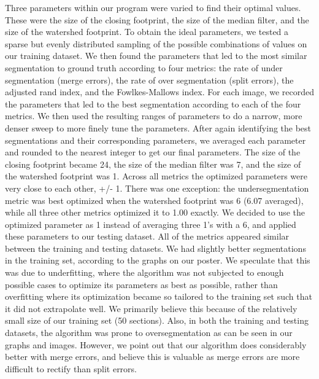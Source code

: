 \documentclass[11pt]{article}
\begin{document}
Three parameters within our program were varied to find their optimal values. These were the size of the closing footprint, the size of the median filter, and the size of the watershed footprint. To obtain the ideal parameters, we tested a sparse but evenly distributed sampling of the possible combinations of values on our training dataset. We then found the parameters that led to the most similar segmentation to ground truth according to four metrics: the rate of under segmentation (merge errors), the rate of over segmentation (split errors), the adjusted rand index, and the Fowlkes-Mallows index. For each image, we recorded the parameters that led to the best segmentation according to each of the four metrics. We then used the resulting ranges of parameters to do a narrow, more denser sweep to more finely tune the parameters. After again identifying the best segmentations and their corresponding parameters, we averaged each parameter and rounded to the nearest integer to get our final parameters. The size of the closing footprint became 24, the size of the median filter was 7, and the size of the watershed footprint was 1. Across all metrics the optimized parameters were very close to each other, +/- 1. There was one exception: the undersegmentation metric was best optimized when the watershed footprint was 6 (6.07 averaged), while all three other metrics optimized it to 1.00 exactly. We decided to use the optimized parameter as 1 instead of averaging three 1's with a 6, and applied these parameters to our testing dataset. All of the metrics appeared similar between the training and testing datasets. We had slightly better segmentations in the training set, according to the graphs on our poster. We speculate that this was due to underfitting, where the algorithm was not subjected to enough possible cases to optimize its parameters as best as possible, rather than overfitting where its optimization became so tailored to the training set such that it did not extrapolate well. We primarily believe this because of the relatively small size of our training set (50 sections). Also, in both the training and testing datasets, the algorithm was prone to oversegmentation as can be seen in our graphs and images. However, we point out that our algorithm does considerably better with merge errors, and believe this is valuable as merge errors are more difficult to rectify than split errors. 
\end{document}

